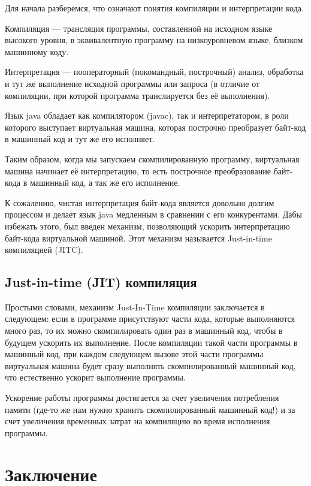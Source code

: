 \documentclass[]{scrartcl}
\begin{document}
Для начала разберемся, что означают понятия компиляции и интерпретации кода.

Компиляция — трансляция программы, составленной на исходном языке высокого уровня, в эквивалентную программу на низкоуровневом языке, близком машинному коду. 

Интерпретация — пооператорный (покомандный, построчный) анализ, обработка и тут же выполнение исходной программы или запроса (в отличие от компиляции, при которой программа транслируется без её выполнения).

Язык java обладает как компилятором (javac), так и интерпретатором, в роли которого выступает виртуальная машина, которая построчно преобразует байт-код в машинный код и тут же его исполняет. 

Таким образом, когда мы запускаем скомпилированную программу, виртуальная машина начинает её интерпретацию, то есть построчное преобразование байт-кода в машинный код, а так же его исполнение.

К сожалению, чистая интерпретация байт-кода является довольно долгим процессом и делает язык java медленным в сравнении с его конкурентами. Дабы избежать этого, был введен механизм, позволяющий ускорить интерпретацию байт-кода виртуальной машиной. Этот механизм называется Just-in-time компиляцией (JITC).

\subsection{Just-in-time (JIT) компиляция}

Простыми словами, механизм Just-In-Time компиляции заключается в следующем: если в программе присутствуют части кода, которые выполняются много раз, то их можно скомпилировать один раз в машинный код, чтобы в будущем ускорить их выполнение. После компиляции такой части программы в машинный код, при каждом следующем вызове этой части программы виртуальная машина будет сразу выполнять скомпилированный машинный код, что естественно ускорит выполнение программы.

Ускорение работы программы достигается за счет увеличения потребления памяти (где-то же нам нужно хранить скомпилированный машинный код!) и за счет увеличения временных затрат на компиляцию во время исполнения программы.


\section{Заключение}
\end{document}
